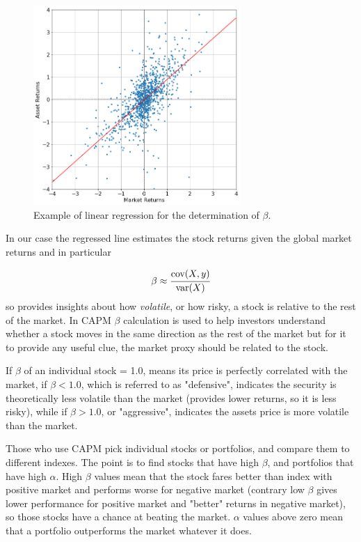 \begin{figure}[htbp]
	\centering
	\includegraphics[width=0.7\textwidth]{figures/linear_regression}
	\caption{Example of linear regression for the determination of $\beta$.}
	\label{fig:linear_regression}
\end{figure}
 
In our case the regressed line estimates the stock returns given the global market returns and in particular 

\begin{equation}
	\beta \approx \cfrac{\textrm{cov}(X,y)}{\textrm {var}(X)}
\end{equation}
so provides insights about how \emph{volatile}, or how risky, a stock is relative to the rest of the market.
In CAPM $\beta$ calculation is used to help investors understand whether a stock moves in the same direction as the rest of the market but for it to provide any useful clue, the market proxy should be related to the stock.

If $\beta$ of an individual stock = 1.0, means its price is perfectly correlated with the market, if $\beta < 1.0$, which is referred to as "defensive", indicates the security is theoretically less volatile than the market (provides lower returns, so it is less risky), while if $\beta > 1.0$, or "aggressive", indicates the assets price is more volatile than the market.

Those who use CAPM pick individual stocks or portfolios, and compare them to different indexes. The point is to find stocks that have high $\beta$, and portfolios that have high $\alpha$. High $\beta$ values mean that the stock fares better than index with positive market and performs worse for negative market (contrary low $\beta$ gives lower performance for positive market and "better" returns in negative market), so those stocks have a chance at beating the market. $\alpha$ values above zero mean that a portfolio outperforms the market whatever it does.

